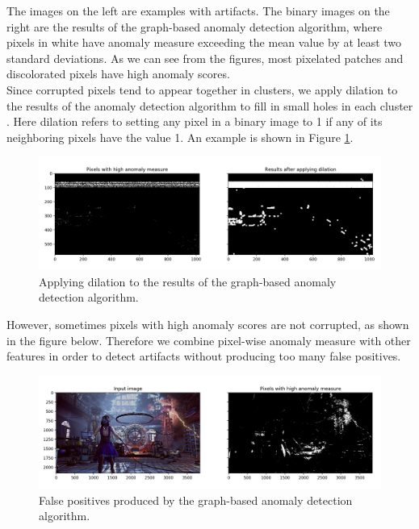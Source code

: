 \noindent The images on the left are examples with artifacts. The binary images on the right are the results of the graph-based anomaly detection algorithm, where pixels in white have anomaly measure exceeding the mean value by at least two standard deviations. As we can see from the figures, most pixelated patches and discolorated pixels have high anomaly scores. \\

\noindent Since corrupted pixels tend to appear together in clusters, we apply dilation to the results of the anomaly detection algorithm to fill in small holes in each cluster \cite{dilation}. Here dilation refers to setting any pixel in a binary image to 1 if any of its neighboring pixels have the value 1. An example is shown in Figure \ref{fig:dilation}.


\begin{figure}[H]
    \centering
    \includegraphics[scale=0.5]{images/dilation.png}
    
    
    \caption{Applying dilation to the results of the graph-based anomaly detection algorithm.}
    \label{fig:dilation}
\end{figure}



\noindent However, sometimes pixels with high anomaly scores are not corrupted, as shown in the figure below. Therefore we combine pixel-wise anomaly measure with other features in order to detect artifacts without producing too many false positives.

\begin{figure}[H]
    \centering
    \includegraphics[scale=0.5]{images/graph_laplacian_false_postive.png}
    

    \caption{False positives produced by the graph-based anomaly detection algorithm.}
    \label{fig:graphlaplacianfp}
\end{figure}



\noindent 

\endinput